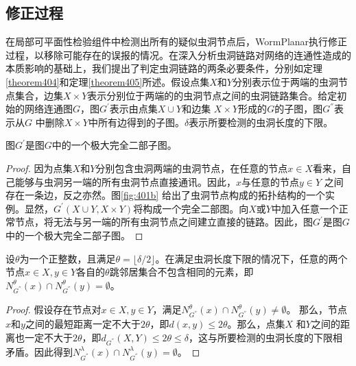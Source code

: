 \subsection{修正过程}
在局部可平面性检验组件中检测出所有的疑似虫洞节点后，WormPlanar执行修正过程，以移除可能存在的误报的情况。在深入分析虫洞链路对网络的连通性造成的本质影响的基础上，我们提出了判定虫洞链路的两条必要条件，分别如定理\ref{theorem404}和定理\ref{theorem405}所述。假设点集$X$和$Y$分别表示位于两端的虫洞节点集合，边集$X\times{Y}$表示分别位于两端的的虫洞节点之间的虫洞链路集合。给定初始的网络连通图$G$，图$G^{'}$表示由点集$X\cup{Y}$和边集
$X\times{Y}$形成的$G$的子图，图$G^{''}$表示从$G$ 中删除$X\times{Y}$中所有边得到的子图。$\delta$表示所要检测的虫洞长度的下限。

\begin{theorem}
  \label{theorem404}
图$G^{'}$是图$G$中的一个极大完全二部子图。
\end{theorem}
\begin{proof}
因为点集$X$和$Y$分别包含虫洞两端的虫洞节点，在任意的节点$x\in{X}$看来，自己能够与虫洞另一端的所有虫洞节点直接通讯。因此，$x$与任意的节点$y\in{Y}$ 之间存在一条边，反之亦然。图\ref{fig:401b} 给出了虫洞节点构成的拓扑结构的一个实例。显然，$G^{'}(X\cup{Y},X\times{Y})$将构成一个完全二部图。向$X$或$Y$中加入任意一个正常节点，将无法与另一端的所有虫洞节点之间建立直接的链路。因此，图$G^{'}$是图$G$中的一个极大完全二部子图。
\end{proof}

\begin{theorem}
  \label{theorem405}
设$\theta$为一个正整数，且满足$\theta=\lfloor\delta/2\rfloor$。在满足虫洞长度下限的情况下，任意的两个节点$x\in{X},y\in{Y}$各自的$\theta$跳邻居集合不包含相同的元素，即$N_{G^{''}}^{\theta}(x)\cap{N_{G^{''}}^{\theta}(y)}=\emptyset$。
\end{theorem}
\begin{proof}
假设存在节点对$x\in{X},y\in{Y}$，满足$N_{G^{''}}^{\theta}(x)\cap{N_{G^{''}}^{\theta}(y)}\not=\emptyset$。 那么，节点$x$和$y$之间的最短距离一定不大于$2\theta$，即$d(x,y)\le{2\theta}$。那么，点集$X$ 和$Y$之间的距离也一定不大于$2\theta$，即$d_{G^{''}}(X,Y)\le2\theta\le\delta$，这与所要检测的虫洞长度的下限相矛盾。因此得到$N_{G^{''}}^{\lambda}(x)\cap{N_{G^{''}}^{\lambda}(y)}=\emptyset$。
\end{proof}

